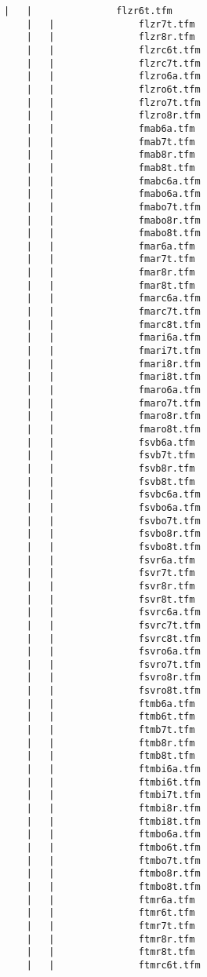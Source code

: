 \begin{lstlisting}[frame=tb, extendedchars=false, breaklines=false, basicstyle=\footnotesize\upshape ,columns=flexible ,keepspaces=true , lineskip={-7.0pt} ]
    |   |               flzr6t.tfm
    |   |               flzr7t.tfm
    |   |               flzr8r.tfm
    |   |               flzrc6t.tfm
    |   |               flzrc7t.tfm
    |   |               flzro6a.tfm
    |   |               flzro6t.tfm
    |   |               flzro7t.tfm
    |   |               flzro8r.tfm
    |   |               fmab6a.tfm
    |   |               fmab7t.tfm
    |   |               fmab8r.tfm
    |   |               fmab8t.tfm
    |   |               fmabc6a.tfm
    |   |               fmabo6a.tfm
    |   |               fmabo7t.tfm
    |   |               fmabo8r.tfm
    |   |               fmabo8t.tfm
    |   |               fmar6a.tfm
    |   |               fmar7t.tfm
    |   |               fmar8r.tfm
    |   |               fmar8t.tfm
    |   |               fmarc6a.tfm
    |   |               fmarc7t.tfm
    |   |               fmarc8t.tfm
    |   |               fmari6a.tfm
    |   |               fmari7t.tfm
    |   |               fmari8r.tfm
    |   |               fmari8t.tfm
    |   |               fmaro6a.tfm
    |   |               fmaro7t.tfm
    |   |               fmaro8r.tfm
    |   |               fmaro8t.tfm
    |   |               fsvb6a.tfm
    |   |               fsvb7t.tfm
    |   |               fsvb8r.tfm
    |   |               fsvb8t.tfm
    |   |               fsvbc6a.tfm
    |   |               fsvbo6a.tfm
    |   |               fsvbo7t.tfm
    |   |               fsvbo8r.tfm
    |   |               fsvbo8t.tfm
    |   |               fsvr6a.tfm
    |   |               fsvr7t.tfm
    |   |               fsvr8r.tfm
    |   |               fsvr8t.tfm
    |   |               fsvrc6a.tfm
    |   |               fsvrc7t.tfm
    |   |               fsvrc8t.tfm
    |   |               fsvro6a.tfm
    |   |               fsvro7t.tfm
    |   |               fsvro8r.tfm
    |   |               fsvro8t.tfm
    |   |               ftmb6a.tfm
    |   |               ftmb6t.tfm
    |   |               ftmb7t.tfm
    |   |               ftmb8r.tfm
    |   |               ftmb8t.tfm
    |   |               ftmbi6a.tfm
    |   |               ftmbi6t.tfm
    |   |               ftmbi7t.tfm
    |   |               ftmbi8r.tfm
    |   |               ftmbi8t.tfm
    |   |               ftmbo6a.tfm
    |   |               ftmbo6t.tfm
    |   |               ftmbo7t.tfm
    |   |               ftmbo8r.tfm
    |   |               ftmbo8t.tfm
    |   |               ftmr6a.tfm
    |   |               ftmr6t.tfm
    |   |               ftmr7t.tfm
    |   |               ftmr8r.tfm
    |   |               ftmr8t.tfm
    |   |               ftmrc6t.tfm

\end{lstlisting}
